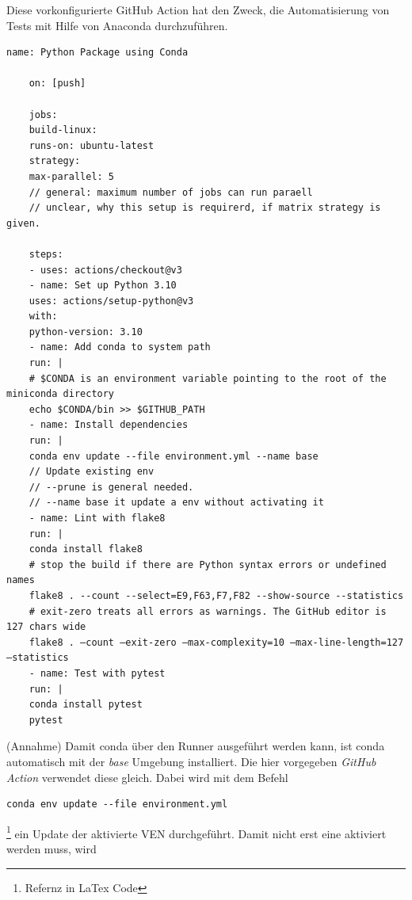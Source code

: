 
Diese vorkonfigurierte GitHub Action hat den Zweck, die Automatisierung von Tests mit Hilfe von Anaconda durchzuführen.

\begin{lstlisting}[style=Config, caption={GitHub Action Temple: Python Package create and test with conda}, captionpos=b]
	name: Python Package using Conda
	
	on: [push]
	
	jobs:
	build-linux:
	runs-on: ubuntu-latest
	strategy:
	max-parallel: 5
	// general: maximum number of jobs can run paraell
	// unclear, why this setup is requirerd, if matrix strategy is given.
	
	steps:
	- uses: actions/checkout@v3
	- name: Set up Python 3.10
	uses: actions/setup-python@v3
	with:
	python-version: 3.10
	- name: Add conda to system path
	run: |
	# $CONDA is an environment variable pointing to the root of the miniconda directory
	echo $CONDA/bin >> $GITHUB_PATH
	- name: Install dependencies
	run: |
	conda env update --file environment.yml --name base
	// Update existing env 
	// --prune is general needed.
	// --name base it update a env without activating it
	- name: Lint with flake8
	run: |
	conda install flake8
	# stop the build if there are Python syntax errors or undefined names
	flake8 . --count --select=E9,F63,F7,F82 --show-source --statistics
	# exit-zero treats all errors as warnings. The GitHub editor is 127 chars wide
	flake8 . —count —exit-zero —max-complexity=10 —max-line-length=127 —statistics
	- name: Test with pytest
	run: |
	conda install pytest
	pytest
\end{lstlisting}
(Annahme) Damit conda über den Runner ausgeführt werden kann,  ist conda automatisch mit der \textit{base} Umgebung installiert. Die hier vorgegeben \textit{GitHub Action} verwendet diese gleich. Dabei wird mit dem Befehl 
\begin{lstlisting}[style=CMD, caption={github default install dependencies}, captionpos=b]
	conda env update --file environment.yml
\end{lstlisting}\footnote{
	Refernz in LaTex Code %
}
ein Update der aktivierte \gls{VEN} durchgeführt. Damit nicht erst eine aktiviert werden muss, wird 

